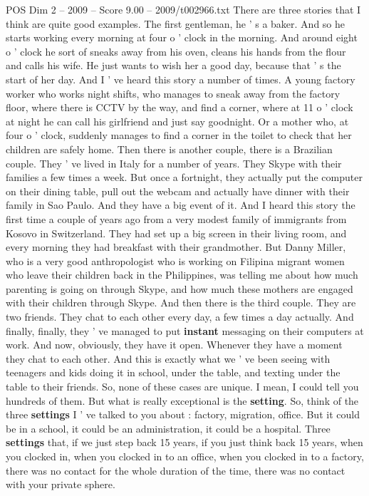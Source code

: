 \begin{textsample}{POS Dim 2 – 2009 – Score 9.00 – 2009/t002966.txt}
There are three stories that I think are quite good examples.
The first gentleman, he ' s a baker.
And so he starts working every morning at four o ' clock in the morning.
And around eight o ' clock he sort of sneaks away from his oven, cleans his hands from the flour and calls his wife.
He just wants to wish her a good day, because that ' s the start of her day.
And I ' ve heard this story a number of times.
A young factory worker who works night shifts, who manages to sneak away from the factory floor, where there is CCTV by the way, and find a corner, where at 11 o ' clock at night he can call his girlfriend and just say goodnight.
Or a mother who, at four o ' clock, suddenly manages to find a corner in the toilet to check that her children are safely home.
Then there is another couple, there is a Brazilian couple.
They ' ve lived in Italy for a number of years.
They Skype with their families a few times a week.
But once a fortnight, they actually put the computer on their dining table, pull out the webcam and actually have dinner with their family in Sao Paulo.
And they have a big event of it.
And I heard this story the first time a couple of years ago from a very modest family of immigrants from Kosovo in Switzerland.
They had set up a big screen in their living room, and every morning they had breakfast with their grandmother.
But Danny Miller, who is a very good anthropologist who is working on Filipina migrant women who leave their children back in the Philippines, was telling me about how much parenting is going on through Skype, and how much these mothers are engaged with their children through Skype.
And then there is the third couple.
They are two friends.
They chat to each other every day, a few times a day actually.
And finally, finally, they ' ve managed to put \textbf{instant} messaging on their computers at work.
And now, obviously, they have it open.
Whenever they have a moment they chat to each other.
And this is exactly what we ' ve been seeing with teenagers and kids doing it in school, under the table, and texting under the table to their friends.
So, none of these cases are unique.
I mean, I could tell you hundreds of them.
But what is really exceptional is the \textbf{setting}.
So, think of the three \textbf{settings} I ' ve talked to you about : factory, migration, office.
But it could be in a school, it could be an administration, it could be a hospital.
Three \textbf{settings} that, if we just step back 15 years, if you just think back 15 years, when you clocked in, when you clocked in to an office, when you clocked in to a factory, there was no contact for the whole duration of the time, there was no contact with your private sphere.

\end{textsample}
